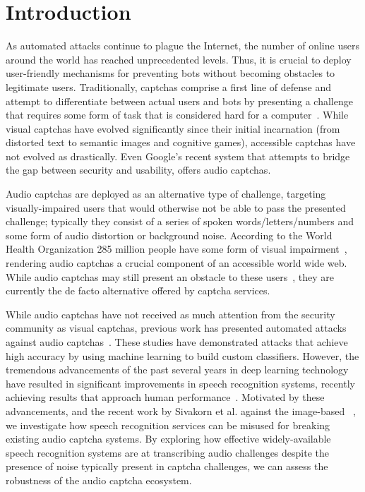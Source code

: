 \section{Introduction}
\label{sec:intro}

As automated attacks continue to plague the Internet,
the number of online users around the world has reached unprecedented levels.
Thus, it is crucial to deploy user-friendly mechanisms for preventing bots without
becoming obstacles to legitimate users. Traditionally, captchas comprise a first
line of defense and attempt to differentiate between actual users and bots by 
presenting a challenge that requires some form of task that is considered hard 
for a computer~\cite{captcha}. While visual captchas have evolved significantly 
since their initial incarnation (from distorted text to semantic images and cognitive games),
accessible captchas have not evolved as drastically. Even Google's recent \re system that 
attempts to bridge the gap between security and usability, offers audio captchas.

Audio captchas are deployed as an alternative type of challenge, targeting
visually-impaired users that would otherwise not be able to pass the presented
challenge; typically they consist of a series of spoken words/letters/numbers 
and some form of audio distortion or background noise.
According to the World Health Organization 285 million people have 
some form of visual impairment~\cite{impaired}, rendering audio captchas a
crucial component of an accessible world wide web. While audio captchas may still present
an obstacle to these users~\cite{sauer2008towards,bigham2008inspiring,bigham2009evaluating},
they are currently the de facto alternative offered by captcha services.

While audio captchas have not received as much attention from the security community as visual captchas,
previous work has presented automated attacks against audio captchas~\cite{Sano2013,Bursztein2009,
meutzner2014using,tam2009breaking,bursztein2011failure}. These studies have demonstrated attacks
that achieve high accuracy by using machine learning to build custom classifiers.
However, the tremendous advancements of the past several years in deep learning technology have
resulted in significant improvements in speech recognition systems, recently achieving
results that approach human performance~\cite{ibm_blog,saon2017english}. Motivated
by these advancements, and the recent work by Sivakorn et al. against the image-based
\re~\cite{sivakorn:eurosp16}, we investigate how speech recognition services
can be misused for breaking existing audio captcha systems. By exploring how effective
widely-available speech recognition systems are at transcribing audio challenges despite 
the presence of noise typically present in captcha challenges, we can assess the robustness 
of the audio captcha ecosystem.

